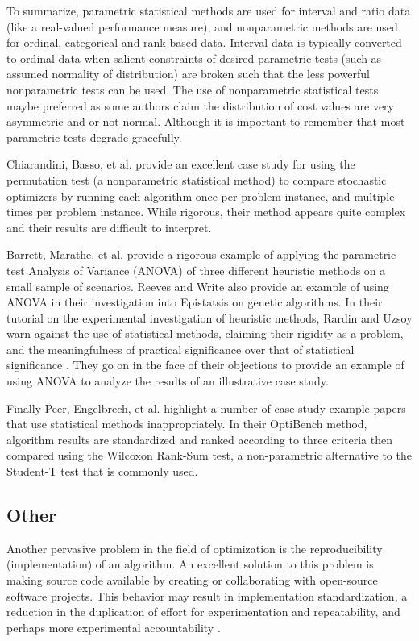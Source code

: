 To summarize, parametric statistical methods are used for interval and ratio data (like a real-valued performance measure), and nonparametric methods are used for ordinal, categorical and rank-based data. Interval data is typically converted to ordinal data when salient constraints of desired parametric tests (such as assumed normality of distribution) are broken such that the less powerful nonparametric tests can be used. The use of nonparametric statistical tests maybe preferred as some authors \cite{Peer2003, Chiarandini2005} claim the distribution of cost values are very asymmetric and or not normal. Although it is important to remember that most parametric tests degrade gracefully.

Chiarandini, Basso, et al. \cite{Chiarandini2005} provide an excellent case study for using the permutation test (a nonparametric statistical method) to compare stochastic optimizers by running each algorithm once per problem instance, and multiple times per problem instance. While rigorous, their method appears quite complex and their results are difficult to interpret.

Barrett, Marathe, et al. \cite{Barrett2003} provide a rigorous example of applying the parametric test Analysis of Variance (ANOVA) of three different heuristic methods on a small sample of scenarios. Reeves and Write \cite{Reeves1995, Reeves1995a} also provide an example of using ANOVA in their investigation into Epistatsis on genetic algorithms. In their tutorial on the experimental investigation of heuristic methods, Rardin and Uzsoy \cite{Rardin2001} warn against the use of statistical methods, claiming their rigidity as a problem, and the meaningfulness of practical significance over that of statistical significance . They go on in the face of their objections to provide an example of using ANOVA to analyze the results of an illustrative case study.

Finally Peer, Engelbrech, et al. \cite{Peer2003} highlight a number of case study example papers that use statistical methods inappropriately. In their OptiBench method, algorithm results are standardized and ranked according to three criteria then compared using the Wilcoxon Rank-Sum test, a non-parametric alternative to the Student-T test that is commonly used.

% 
% 
\subsection{Other}
Another pervasive problem in the field of optimization is the reproducibility (implementation) of an algorithm. An excellent solution to this problem is making source code available by creating or collaborating with open-source software projects. This behavior may result in implementation standardization, a reduction in the duplication of effort for experimentation and repeatability, and perhaps more experimental accountability \cite{Eiben2002, Peer2003}.

